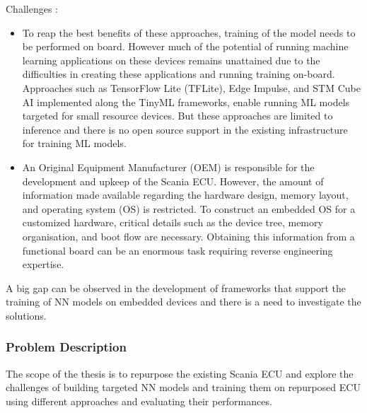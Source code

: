 Challenges :
\begin{itemize}
	\item To reap the best benefits of these approaches, training of the model needs to be performed on board. However much of the potential of running machine learning applications on these devices remains unattained due to the difficulties in creating these applications and running training on-board. Approaches such as TensorFlow Lite (TFLite), Edge Impulse, and STM Cube AI implemented along the TinyML frameworks, enable running ML models targeted for small resource devices. But these approaches are limited to inference and there is no open source support in the existing infrastructure for training ML models.

	\item An Original Equipment Manufacturer (OEM) is responsible for the development and upkeep of the Scania ECU. However, the amount of information made available regarding the hardware design, memory layout, and operating system (OS) is restricted. To construct an embedded OS for a customized hardware, critical details such as the device tree, memory organisation, and boot flow are necessary. Obtaining this information from a functional board can be an enormous task requiring reverse engineering expertise.
\end{itemize}

A big gap can be observed in the development of frameworks that support the training of NN models on embedded devices and there is a need to investigate the solutions.



\subsubsection{Problem Description}
The scope of the thesis is to repurpose the existing Scania ECU and explore the challenges of building targeted NN models and training them on repurposed ECU using different approaches and evaluating their performances.

